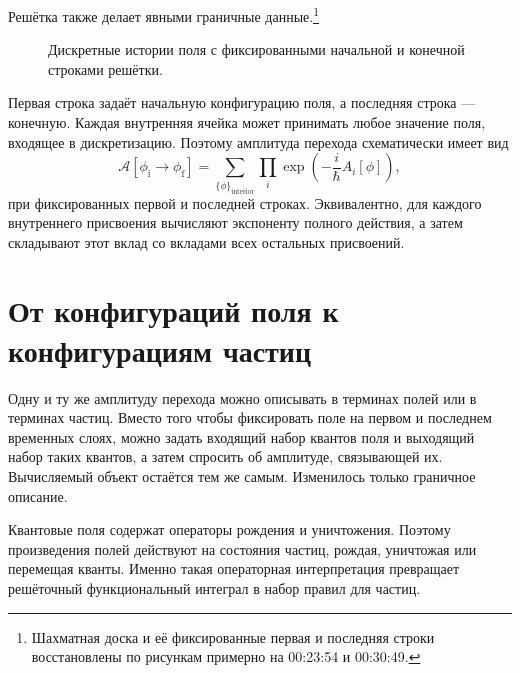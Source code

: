 Решётка также делает явными граничные данные.\footnote{Шахматная доска и её фиксированные первая и последняя строки восстановлены по рисункам примерно на 00:23:54 и 00:30:49.}
\begin{figure}[htbp]
\centering
{}
\caption{Дискретные истории поля с фиксированными начальной и конечной строками решётки.}
\end{figure}

Первая строка задаёт начальную конфигурацию поля, а последняя строка — конечную. Каждая внутренняя ячейка может принимать любое значение поля, входящее в дискретизацию. Поэтому амплитуда перехода схематически имеет вид
\begin{equation}
\mathcal{A}\!\left[\phi_{\mathrm{i}}\rightarrow\phi_{\mathrm{f}}\right]
=
\sum_{\{\phi\}_{\mathrm{interior}}}
\prod_i\exp\!\left(-\frac{i}{\hbar}A_i[\phi]\right),
\end{equation}
при фиксированных первой и последней строках. Эквивалентно, для каждого внутреннего присвоения вычисляют экспоненту полного действия, а затем складывают этот вклад со вкладами всех остальных присвоений.

\section{От конфигураций поля к конфигурациям частиц}

Одну и ту же амплитуду перехода можно описывать в терминах полей или в терминах частиц. Вместо того чтобы фиксировать поле на первом и последнем временных слоях, можно задать входящий набор квантов поля и выходящий набор таких квантов, а затем спросить об амплитуде, связывающей их. Вычисляемый объект остаётся тем же самым. Изменилось только граничное описание.

Квантовые поля содержат операторы рождения и уничтожения. Поэтому произведения полей действуют на состояния частиц, рождая, уничтожая или перемещая кванты. Именно такая операторная интерпретация превращает решёточный функциональный интеграл в набор правил для частиц.

